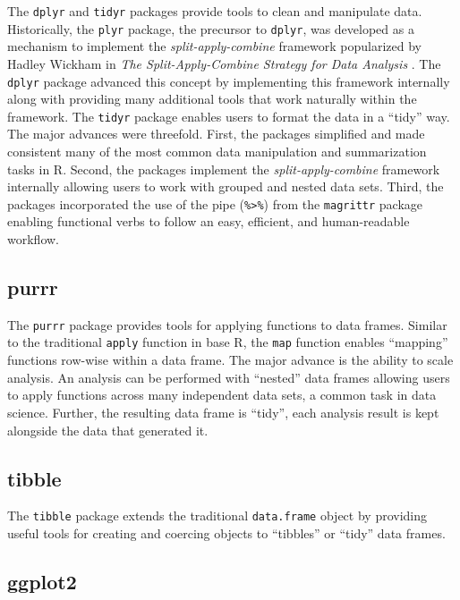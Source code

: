 The \texttt{dplyr} and \texttt{tidyr} packages provide tools to clean
and manipulate data. Historically, the \texttt{plyr} package, the
precursor to \texttt{dplyr}, was developed as a mechanism to implement
the \emph{split-apply-combine} framework popularized by Hadley Wickham
in \emph{The Split-Apply-Combine Strategy for Data Analysis}
\citep{plyr}. The \texttt{dplyr} package advanced this concept by
implementing this framework internally along with providing many
additional tools that work naturally within the framework. The
\texttt{tidyr} package enables users to format the data in a ``tidy''
way. The major advances were threefold. First, the packages simplified
and made consistent many of the most common data manipulation and
summarization tasks in R. Second, the packages implement the
\emph{split-apply-combine} framework internally allowing users to work
with grouped and nested data sets. Third, the packages incorporated the
use of the pipe (\texttt{\%\textgreater{}\%}) from the \texttt{magrittr}
package enabling functional verbs to follow an easy, efficient, and
human-readable workflow.

\subsection{purrr}\label{purrr}

The \texttt{purrr} package provides tools for applying functions to data
frames. Similar to the traditional \texttt{apply} function in base R,
the \texttt{map} function enables ``mapping'' functions row-wise within
a data frame. The major advance is the ability to scale analysis. An
analysis can be performed with ``nested'' data frames allowing users to
apply functions across many independent data sets, a common task in data
science. Further, the resulting data frame is ``tidy'', each analysis
result is kept alongside the data that generated it.

\subsection{tibble}\label{tibble}

The \texttt{tibble} package extends the traditional \texttt{data.frame}
object by providing useful tools for creating and coercing objects to
``tibbles'' or ``tidy'' data frames.

\subsection{ggplot2}\label{ggplot2}

